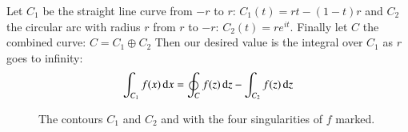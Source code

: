 Let $C_1$ be the straight line curve from $-r$ to $r$: $C_1(t) =rt-(1-t)r$ and
$C_2$ the circular arc with radius $r$ from $r$  to $-r$: $C_2(t) = re^{it}$.
Finally let $C$ the combined curve: $C= C_1 \oplus C_2$
Then our desired value is the integral over $C_1$ as $r$ goes to infinity:
\begin{equation}
	\int_{C_1} f(x) \mathop{}\!\mathrm{d} x = \oint_{C} f(z) \mathop{}\!\mathrm{d} z - \int_{C_2} f(z) \mathop{}\!\mathrm{d} z
\end{equation}


\begin{figure}[ht]
	\caption[Contour Integral]{The contours $C_1$ and $C_2$ and with the four singularities of $f$ marked.}
	\label{fig:contourintegration}
	\centering
\end{figure}

